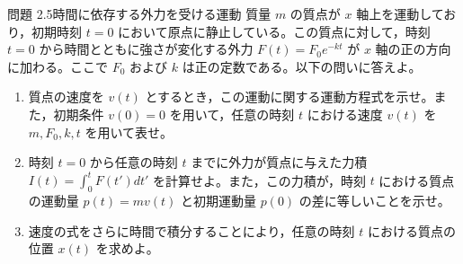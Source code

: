 \problemstart
{}

\begin{problemBox}{問題 2.5\quad 時間に依存する外力を受ける運動\hspace{1.2em}{\small\mdseries 〔標準〕}}
質量 $m$ の質点が $x$ 軸上を運動しており，初期時刻 $t=0$ において原点に静止している。この質点に対して，時刻 $t=0$ から時間とともに強さが変化する外力 $F(t) = F_0 e^{-kt}$ が $x$ 軸の正の方向に加わる。ここで $F_0$ および $k$ は正の定数である。以下の問いに答えよ。

\begin{enumerate}
  \item 質点の速度を $v(t)$ とするとき，この運動に関する運動方程式を示せ。また，初期条件 $v(0)=0$ を用いて，任意の時刻 $t$ における速度 $v(t)$ を $m, F_0, k, t$ を用いて表せ。

  \item 時刻 $t=0$ から任意の時刻 $t$ までに外力が質点に与えた力積 $I(t) = \int_0^t F(t') dt'$ を計算せよ。また，この力積が，時刻 $t$ における質点の運動量 $p(t) = mv(t)$ と初期運動量 $p(0)$ の差に等しいことを示せ。

  \item 速度の式をさらに時間で積分することにより，任意の時刻 $t$ における質点の位置 $x(t)$ を求めよ。
\end{enumerate}
\end{problemBox}

